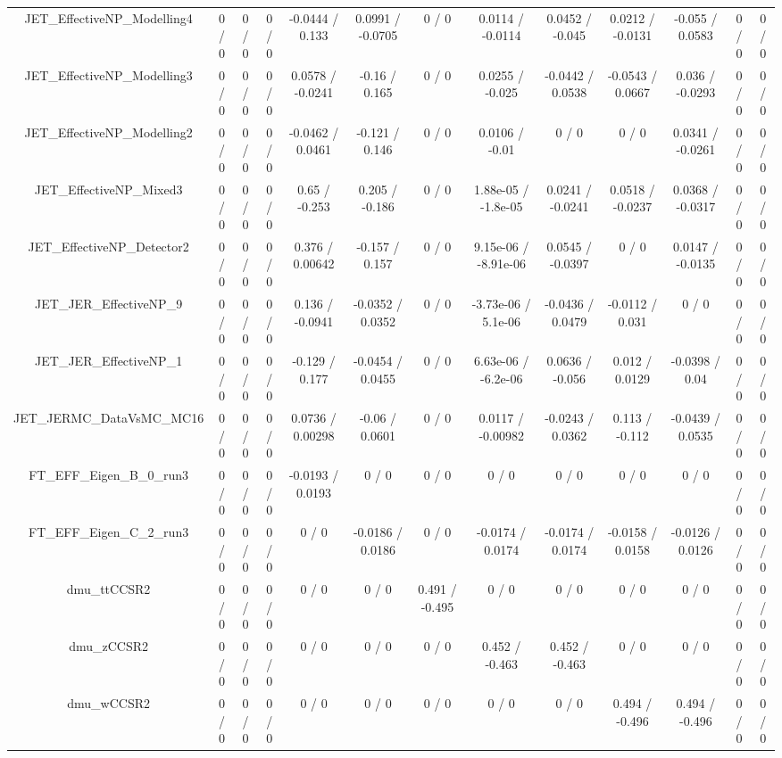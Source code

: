 \documentclass[10pt]{article}
\begin{document}
\begin{table}[htbp]
\begin{center}
\begin{tabular}{|c|c|c|c|c|c|c|c|c|c|c|c|c|}
  JET_EffectiveNP_Modelling4 & 0 / 0 & 0 / 0 & 0 / 0 & -0.0444 / 0.133 & 0.0991 / -0.0705 & 0 / 0 & 0.0114 / -0.0114 & 0.0452 / -0.045 & 0.0212 / -0.0131 & -0.055 / 0.0583 & 0 / 0 & 0 / 0 \\ 
  JET_EffectiveNP_Modelling3 & 0 / 0 & 0 / 0 & 0 / 0 & 0.0578 / -0.0241 & -0.16 / 0.165 & 0 / 0 & 0.0255 / -0.025 & -0.0442 / 0.0538 & -0.0543 / 0.0667 & 0.036 / -0.0293 & 0 / 0 & 0 / 0 \\ 
  JET_EffectiveNP_Modelling2 & 0 / 0 & 0 / 0 & 0 / 0 & -0.0462 / 0.0461 & -0.121 / 0.146 & 0 / 0 & 0.0106 / -0.01 & 0 / 0 & 0 / 0 & 0.0341 / -0.0261 & 0 / 0 & 0 / 0 \\ 
  JET_EffectiveNP_Mixed3 & 0 / 0 & 0 / 0 & 0 / 0 & 0.65 / -0.253 & 0.205 / -0.186 & 0 / 0 & 1.88e-05 / -1.8e-05 & 0.0241 / -0.0241 & 0.0518 / -0.0237 & 0.0368 / -0.0317 & 0 / 0 & 0 / 0 \\ 
  JET_EffectiveNP_Detector2 & 0 / 0 & 0 / 0 & 0 / 0 & 0.376 / 0.00642 & -0.157 / 0.157 & 0 / 0 & 9.15e-06 / -8.91e-06 & 0.0545 / -0.0397 & 0 / 0 & 0.0147 / -0.0135 & 0 / 0 & 0 / 0 \\ 
  JET_JER_EffectiveNP_9 & 0 / 0 & 0 / 0 & 0 / 0 & 0.136 / -0.0941 & -0.0352 / 0.0352 & 0 / 0 & -3.73e-06 / 5.1e-06 & -0.0436 / 0.0479 & -0.0112 / 0.031 & 0 / 0 & 0 / 0 & 0 / 0 \\ 
  JET_JER_EffectiveNP_1 & 0 / 0 & 0 / 0 & 0 / 0 & -0.129 / 0.177 & -0.0454 / 0.0455 & 0 / 0 & 6.63e-06 / -6.2e-06 & 0.0636 / -0.056 & 0.012 / 0.0129 & -0.0398 / 0.04 & 0 / 0 & 0 / 0 \\ 
  JET_JERMC_DataVsMC_MC16 & 0 / 0 & 0 / 0 & 0 / 0 & 0.0736 / 0.00298 & -0.06 / 0.0601 & 0 / 0 & 0.0117 / -0.00982 & -0.0243 / 0.0362 & 0.113 / -0.112 & -0.0439 / 0.0535 & 0 / 0 & 0 / 0 \\ 
  FT_EFF_Eigen_B_0_run3 & 0 / 0 & 0 / 0 & 0 / 0 & -0.0193 / 0.0193 & 0 / 0 & 0 / 0 & 0 / 0 & 0 / 0 & 0 / 0 & 0 / 0 & 0 / 0 & 0 / 0 \\ 
  FT_EFF_Eigen_C_2_run3 & 0 / 0 & 0 / 0 & 0 / 0 & 0 / 0 & -0.0186 / 0.0186 & 0 / 0 & -0.0174 / 0.0174 & -0.0174 / 0.0174 & -0.0158 / 0.0158 & -0.0126 / 0.0126 & 0 / 0 & 0 / 0 \\ 
  dmu_ttCCSR2 & 0 / 0 & 0 / 0 & 0 / 0 & 0 / 0 & 0 / 0 & 0.491 / -0.495 & 0 / 0 & 0 / 0 & 0 / 0 & 0 / 0 & 0 / 0 & 0 / 0 \\ 
  dmu_zCCSR2 & 0 / 0 & 0 / 0 & 0 / 0 & 0 / 0 & 0 / 0 & 0 / 0 & 0.452 / -0.463 & 0.452 / -0.463 & 0 / 0 & 0 / 0 & 0 / 0 & 0 / 0 \\ 
  dmu_wCCSR2 & 0 / 0 & 0 / 0 & 0 / 0 & 0 / 0 & 0 / 0 & 0 / 0 & 0 / 0 & 0 / 0 & 0.494 / -0.496 & 0.494 / -0.496 & 0 / 0 & 0 / 0 \\ 

\end{tabular}
\end{center}
\end{table}
\end{document}
